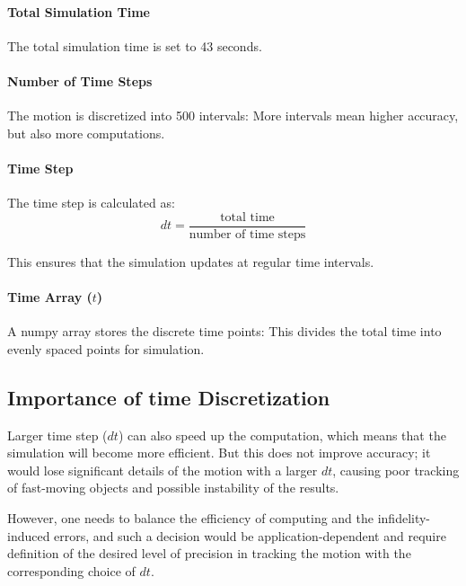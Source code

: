 \documentclass{article}
\begin{document}
\paragraph{Total Simulation Time}
The total simulation time is set to 43 seconds.

\paragraph{Number of Time Steps}
The motion is discretized into 500 intervals:
More intervals mean higher accuracy, but also more computations.

\paragraph{Time Step}
The time step is calculated as:
\begin{equation}
dt = \frac{\text{total time}}{\text{number of time steps}}
\end{equation}

This ensures that the simulation updates at regular time intervals.

\paragraph{Time Array ($t$)}
A numpy array stores the discrete time points:
This divides the total time into evenly spaced points for simulation.

\subsection*{Importance of time Discretization}
Larger time step ($dt$) can also speed up the computation, which means that the simulation will become more efficient. But this does not improve accuracy; it would lose significant details of the motion with a larger $dt$, causing poor tracking of fast-moving objects and possible instability of the results.

However, one needs to balance the efficiency of computing and the infidelity-induced errors, and such a decision would be application-dependent and require definition of the desired level of precision in tracking the motion with the corresponding choice of $dt$.
\end{document}

